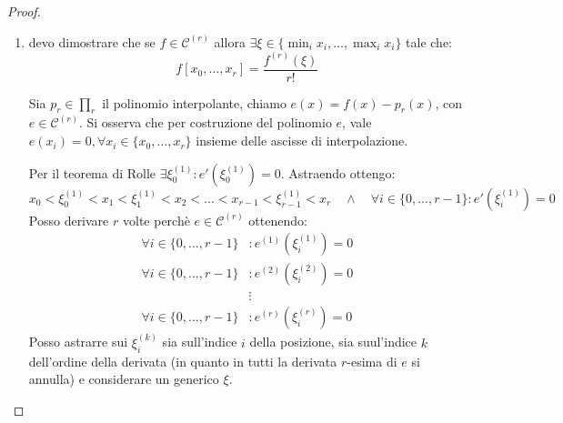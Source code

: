 \begin{proof}
\begin{enumerate}
  \item devo dimostrare che se $f \in \mathcal{C}^{(r)}$ allora $\exists \xi
  \in \{\min_{i}{x_{i}}, \ldots, \max_{i}{x_{i}}\}$ tale che:
  \begin{displaymath}
  	f[x_{0}, \ldots, x_{r}] = \frac{f^{(r)}(\xi)}{r!}
  \end{displaymath}
  
  Sia $p_{r} \in \prod_{r}$ il polinomio interpolante, chiamo $e(x) = f(x) -
  p_{r}(x)$, con $e \in \mathcal{C}^{(r)}$. Si osserva che per costruzione del
  polinomio $e$, vale $e(x_{i}) = 0, \forall x_{i} \in \{x_{0}, \ldots, x_{r}\}$
  insieme delle ascisse di interpolazione.
  
  Per il teorema di Rolle $\exists \xi_{0}^{(1)}: e'(\xi_{0}^{(1)}) = 0$.
  Astraendo ottengo:
  \begin{displaymath}
 	x_{0} < \xi_{0}^{(1)} < x_{1} < \xi_{1}^{(1)} < x_{2} < \ldots < x_{r-1} <
 	\xi_{r-1}^{(1)} < x_{r} \quad \wedge \quad \forall i \in \{ 0, \ldots, r-1\}:
 	e'(\xi_{i}^{(1)}) = 0
  \end{displaymath}
  Posso derivare $r$ volte perch\`e $e \in \mathcal{C}^{(r)}$ ottenendo:
  \begin{displaymath}
  \begin{split}
 	\forall i \in \{ 0, \ldots, r-1\}&:	e^{(1)}(\xi_{i}^{(1)}) = 0 \\
 	\forall i \in \{ 0, \ldots, r-1\}&:	e^{(2)}(\xi_{i}^{(2)}) = 0 \\
 	& \vdots \\
 	\forall i \in \{ 0, \ldots, r-1\}&:	e^{(r)}(\xi_{i}^{(r)}) = 0
  \end{split}
  \end{displaymath}
  Posso astrarre sui $\xi_{i}^{(k)}$ sia sull'indice $i$ della posizione, sia
  suul'indice $k$ dell'ordine della derivata (in quanto in tutti la derivata
  $r$-esima di $e$ si annulla) e considerare un generico $\xi$.
  

\end{enumerate}
\end{proof}
